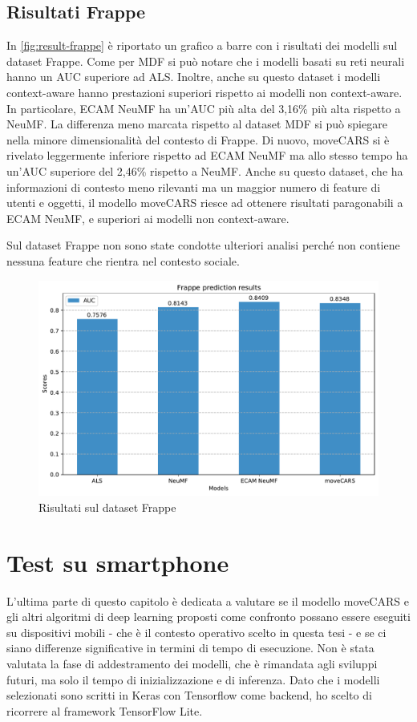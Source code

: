 \documentclass[12pt,italian]{report}
\begin{document}
\subsection{Risultati Frappe}
In \autoref{fig:result-frappe} è riportato un grafico a barre con i risultati dei modelli sul dataset Frappe. Come per MDF si può notare che i modelli basati su reti neurali hanno un AUC superiore ad ALS. Inoltre, anche su questo dataset i modelli context-aware hanno prestazioni superiori rispetto ai modelli non context-aware. In particolare, ECAM NeuMF ha un'AUC più alta del 3,16\% più alta rispetto a NeuMF. La differenza meno marcata rispetto al dataset MDF si può spiegare nella minore dimensionalità del contesto di Frappe. Di nuovo, moveCARS si è rivelato leggermente inferiore rispetto ad ECAM NeuMF ma allo stesso tempo ha un'AUC superiore del 2,46\% rispetto a NeuMF. Anche su questo dataset, che ha informazioni di contesto meno rilevanti ma un maggior numero di feature di utenti e oggetti, il modello moveCARS riesce ad ottenere risultati paragonabili a ECAM NeuMF, e superiori ai modelli non context-aware.

Sul dataset Frappe non sono state condotte ulteriori analisi perché non contiene nessuna feature che rientra nel contesto sociale.

\begin{figure}
  \centering
  \includegraphics[width=\linewidth]{immagini/frappe_test_results.pdf}
  \caption{Risultati sul dataset Frappe}
  \label{fig:result-frappe}
\end{figure}

\section{Test su smartphone} \label{sec:smartphone}
L'ultima parte di questo capitolo è dedicata a valutare se il modello moveCARS e gli altri algoritmi di deep learning proposti come confronto possano essere eseguiti su dispositivi mobili  - che è il contesto operativo scelto in questa tesi - e se ci siano differenze significative in termini di tempo di esecuzione. Non è stata valutata la fase di addestramento dei modelli, che è rimandata agli sviluppi futuri, ma solo il tempo di inizializzazione e di inferenza. Dato che i modelli selezionati sono scritti in Keras con Tensorflow come backend, ho scelto di ricorrere al framework TensorFlow Lite. 
\end{document}
